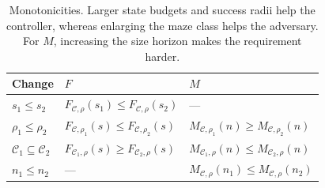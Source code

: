 \begin{table}[!htbp]
\centering\small
\begin{tabular}{@{}lll@{}}
\toprule
Change & $F$ & $M$ \\
\midrule
$s_1\le s_2$ & $F_{\mathcal C,\rho}(s_1)\le F_{\mathcal C,\rho}(s_2)$ & --- \\
$\rho_1\le\rho_2$ & $F_{\mathcal C,\rho_1}(s)\le F_{\mathcal C,\rho_2}(s)$ & $M_{\mathcal C,\rho_1}(n)\ge M_{\mathcal C,\rho_2}(n)$ \\
$\mathcal C_1\subseteq\mathcal C_2$ & $F_{\mathcal C_1,\rho}(s)\ge F_{\mathcal C_2,\rho}(s)$ & $M_{\mathcal C_1,\rho}(n)\le M_{\mathcal C_2,\rho}(n)$ \\
$n_1\le n_2$ & --- & $M_{\mathcal C,\rho}(n_1)\le M_{\mathcal C,\rho}(n_2)$ \\
\bottomrule
\end{tabular}
\caption{Monotonicities.  Larger state budgets and success radii help the controller, whereas enlarging the maze class helps the adversary.  For $M$, increasing the size horizon makes the requirement harder.}
\label{tab:monotonicities}
\end{table}

